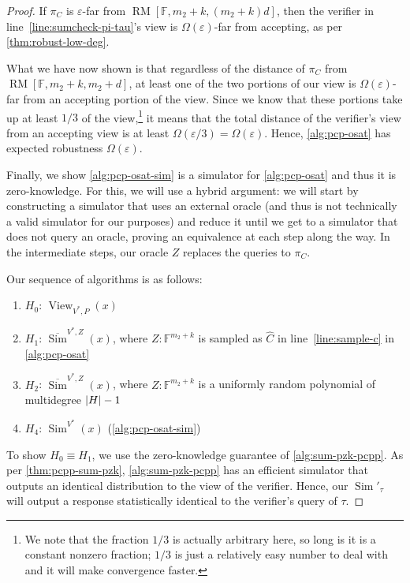 \documentclass[english,12pt]{reedthesis}
\theoremstyle{plain}
\theoremstyle{definition}
\theoremstyle{remark}
\DeclareMathOperator{\RM}{RM}
\DeclareMathOperator{\Sim}{Sim}
\DeclareMathOperator{\View}{View}
\DeclarePairedDelimiter{\abs}{\lvert}{\rvert}
\begin{document}
\begin{proof}
  If $\pi_{C}$ is $\varepsilon$-far from $\RM[\mathbb{F}, m_{2}+k, (m_{2}+k)d]$, then the
  verifier in line~\ref{line:sumcheck-pi-tau}'s view is $\Omega(\varepsilon)$-far from accepting, as per
  \cref{thm:robust-low-deg}.

  What we have now shown is that regardless of the distance of $\pi_{C}$ from
  $\RM[\mathbb{F}, m_{2}+k, m_{2}+d]$, at least one of the two portions of our
  view is $\Omega(\varepsilon)$-far from an accepting portion of the view. Since we know that
  these portions take up at least $1/3$ of the view,\footnote{We note that the
    fraction $1/3$ is actually arbitrary here, so long is it is a constant
    nonzero fraction; $1/3$ is just a relatively easy number to deal with and it
    will make convergence faster.} it means that the total distance of the
  verifier's view from an accepting view is at least $\Omega(\varepsilon/3) = \Omega(\varepsilon)$. Hence,
  \cref{alg:pcp-osat} has expected robustness $\Omega(\varepsilon)$.

  Finally, we show \cref{alg:pcp-osat-sim} is a simulator for
  \cref{alg:pcp-osat} and thus it is zero-knowledge. For this, we will use a
  hybrid argument: we will start by constructing a simulator that uses an
  external oracle (and thus is not technically a valid simulator for our
  purposes) and reduce it until we get to a simulator that does not query an
  oracle, proving an equivalence at each step along the way. In the intermediate
  steps, our oracle $Z$ replaces the queries to $\pi_{C}$.

  Our sequence of algorithms is as follows:
  \begin{enumerate}
    \item $H_{0}$: $\View_{V^{*}, P}(x)$
    \item $H_{1}$: $\overline{\Sim}^{V^{*}, Z}(x)$, where
          $Z\colon \mathbb{F}^{m_{2}+k}$ is sampled as $\hat{C}$ in
          line~\ref{line:sample-c} in \cref{alg:pcp-osat}
    \item $H_{2}$: $\overline{\Sim}^{V^{*}, Z}(x)$, where
          $Z\colon \mathbb{F}^{m_{2}+k}$ is a uniformly random polynomial of
          multidegree $\abs{H} - 1$
    \item $H_{4}$: $\Sim^{V^{*}}(x)$ (\cref{alg:pcp-osat-sim})
  \end{enumerate}

  To show $H_{0} \equiv H_{1}$, we use the zero-knowledge guarantee of
  \cref{alg:sum-pzk-pcpp}. As per \cref{thm:pcpp-sum-pzk},
  \cref{alg:sum-pzk-pcpp} has an efficient simulator that outputs an identical
  distribution to the view of the verifier. Hence, our $\Sim'_{\tau}$ will output
  a response statistically identical to the verifier's query of $\tau$.


\end{proof}
\end{document}
